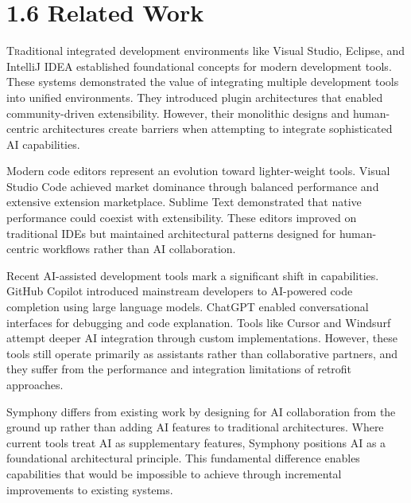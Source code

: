 \clearpage
\section{1.6 Related Work}
\label{sec:related-work}

\lettrine{T}raditional integrated development environments like Visual Studio, Eclipse, and IntelliJ IDEA established foundational concepts for modern development tools. These systems demonstrated the value of integrating multiple development tools into unified environments. They introduced plugin architectures that enabled community-driven extensibility. However, their monolithic designs and human-centric architectures create barriers when attempting to integrate sophisticated AI capabilities.

Modern code editors represent an evolution toward lighter-weight tools. Visual Studio Code achieved market dominance through balanced performance and extensive extension marketplace. Sublime Text demonstrated that native performance could coexist with extensibility. These editors improved on traditional IDEs but maintained architectural patterns designed for human-centric workflows rather than AI collaboration.

Recent AI-assisted development tools mark a significant shift in capabilities. GitHub Copilot introduced mainstream developers to AI-powered code completion using large language models. ChatGPT enabled conversational interfaces for debugging and code explanation. Tools like Cursor and Windsurf attempt deeper AI integration through custom implementations. However, these tools still operate primarily as assistants rather than collaborative partners, and they suffer from the performance and integration limitations of retrofit approaches.

Symphony differs from existing work by designing for AI collaboration from the ground up rather than adding AI features to traditional architectures. Where current tools treat AI as supplementary features, Symphony positions AI as a foundational architectural principle. This fundamental difference enables capabilities that would be impossible to achieve through incremental improvements to existing systems.
